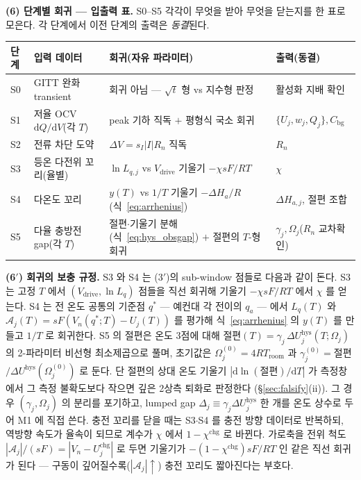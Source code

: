 \documentclass[11pt,a4paper]{article}
\newcommand{\dd}{\mathrm{d}}
\newcommand{\drive}{\mathrm{drive}}
\newcommand{\bg}{\mathrm{bg}}
\newcommand{\chg}{\mathrm{chg}}
\newcommand{\hys}{\mathrm{hys}}
\begin{document}
\textbf{(6) 단계별 회귀 — 입출력 표.} S0--S5 각각이 무엇을 받아 무엇을 닫는지를 한 표로 모은다. 각 단계에서
이전 단계의 출력은 \emph{동결}된다.
\begin{center}
\renewcommand{\arraystretch}{1.35}
\begin{tabular}{p{} p{} p{} p{}}
\toprule
단계 & 입력 데이터 & 회귀(자유 파라미터) & 출력(동결) \\
\midrule
S0 & GITT 완화 transient & 회귀 아님 — $\sqrt t$ 형 vs 지수형 판정 & 활성화 지배 확인 \\
S1 & 저율 OCV $\dd Q/\dd V$(각 $T$) & peak 기하 직독 $+$ 평형식 국소 회귀 & $\{U_j,w_j,Q_j\},C_\bg$ \\
S2 & 전류 차단 도약 & $\Delta V=s_I|I|R_n$ 직독 & $R_n$ \\
S3 & 등온 다전위 꼬리(율별) & $\ln L_{q,j}$ vs $V_\drive$ 기울기 $-\chi sF/RT$ & $\chi$ \\
S4 & 다온도 꼬리 & $y(T)$ vs $1/T$ 기울기 $-\Delta H_a/R$(식~\eqref{eq:arrhenius}) & $\Delta H_{a,j}$, 절편 조합 \\
S5 & 다율 충방전 gap(각 $T$) & 절편$\cdot$기울기 분해(식~\eqref{eq:hys_obsgap}) $+$ 절편의 $T$-형 회귀 & $\gamma_j,\Omega_j$($R_n$ 교차확인) \\
\bottomrule
\end{tabular}
\end{center}

\textbf{(6$'$) 회귀의 보충 규정.} S3 와 S4 는 (3$'$)의 sub-window 점들로 다음과 같이 돈다. S3 는 고정 $T$
에서 $(V_\drive,\ln L_q)$ 점들을 직선 회귀해 기울기 $-\chi sF/RT$ 에서 $\chi$ 를 얻는다. S4 는 전 온도
공통의 기준점 $q^*$ — 예컨대 각 전이의 $q_a$ — 에서 $L_q(T)$ 와
$\mathcal A_j(T)=sF(V_n(q^*;T)-U_j(T))$ 를 평가해 식~\eqref{eq:arrhenius} 의 $y(T)$ 를 만들고 $1/T$ 로
회귀한다. S5 의 절편은 온도 3점에 대해 절편$(T)=\gamma_j\,\Delta U_j^\hys(T;\Omega_j)$ 의 2-파라미터
비선형 최소제곱으로 풀며, 초기값은 $\Omega_j^{(0)}=4RT_{\mathrm{room}}$ 과
$\gamma_j^{(0)}=$절편$/\Delta U^\hys(\Omega_j^{(0)})$ 로 둔다. 단 절편의 상대 온도 기울기
$|\dd\ln(\text{절편})/\dd T|$ 가 측정창에서 그 측정 불확도보다 작으면 깊은 2상측 퇴화로 판정한다
(\S\ref{sec:falsify}(ii)). 그 경우 $(\gamma_j,\Omega_j)$ 의 분리를 포기하고, lumped gap
$\Delta_j\equiv\gamma_j\Delta U_j^\hys$ 한 개를 온도 상수로 두어 M1 에 직접 쓴다. 충전 꼬리를 닫을 때는
S3$\cdot$S4 를 충전 방향 데이터로 반복하되, 역방향 속도가 율속이 되므로 계수가 $\chi$ 에서 $1-\chi^{\chg}$
로 바뀐다. 가로축을 전위 척도 $|\mathcal A_j|/(sF)=|V_n-U_j^{\chg}|$ 로 두면 기울기가
$-(1-\chi^{\chg})sF/RT$ 인 같은 직선 회귀가 된다 — 구동이 깊어질수록($|\mathcal A_j|\uparrow$) 충전 꼬리도
짧아진다는 부호다.
\end{document}
